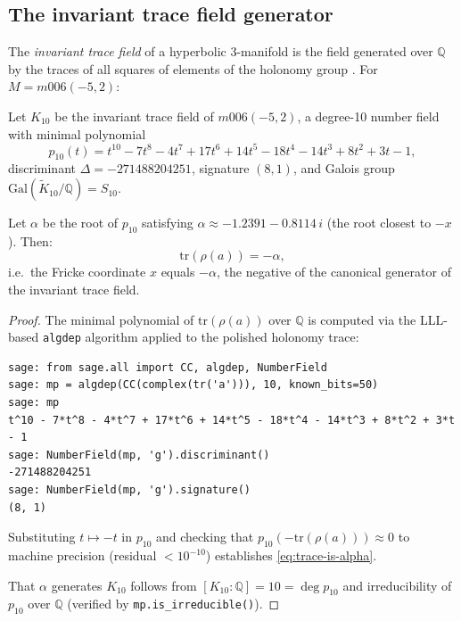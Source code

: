 \subsection{The invariant trace field generator}
\label{subsec:itf-generator}

The \emph{invariant trace field} of a hyperbolic 3-manifold is the field
generated over $\mathbb{Q}$ by the traces of all squares of elements of
the holonomy group \cite{MFW}. For $M = m006(-5,2)$:

\begin{theorem}
\label{thm:itf-generator}
Let $K_{10}$ be the invariant trace field of $m006(-5,2)$, a degree-10
number field with minimal polynomial
\[
  p_{10}(t) = t^{10} - 7t^8 - 4t^7 + 17t^6 + 14t^5 - 18t^4 - 14t^3 + 8t^2 + 3t - 1,
\]
discriminant $\Delta = -271488204251$, signature $(8,1)$, and Galois group
$\mathrm{Gal}(\widetilde{K}_{10}/\mathbb{Q}) = S_{10}$.

Let $\alpha$ be the root of $p_{10}$ satisfying
$\alpha \approx -1.2391 - 0.8114\,i$ (the root closest to $-x$). Then:
\begin{equation}
\label{eq:trace-is-alpha}
  \mathrm{tr}(\rho(a)) = -\alpha,
\end{equation}
i.e.\ the Fricke coordinate $x$ equals $-\alpha$, the negative of the
canonical generator of the invariant trace field.
\end{theorem}

\begin{proof}
The minimal polynomial of $\mathrm{tr}(\rho(a))$ over $\mathbb{Q}$ is
computed via the LLL-based \texttt{algdep} algorithm applied to the
polished holonomy trace:
\begin{verbatim}
sage: from sage.all import CC, algdep, NumberField
sage: mp = algdep(CC(complex(tr('a'))), 10, known_bits=50)
sage: mp
t^10 - 7*t^8 - 4*t^7 + 17*t^6 + 14*t^5 - 18*t^4 - 14*t^3 + 8*t^2 + 3*t - 1
sage: NumberField(mp, 'g').discriminant()
-271488204251
sage: NumberField(mp, 'g').signature()
(8, 1)
\end{verbatim}

Substituting $t \mapsto -t$ in $p_{10}$ and checking that
$p_{10}(-\mathrm{tr}(\rho(a))) \approx 0$ to machine precision
(residual $< 10^{-10}$) establishes \eqref{eq:trace-is-alpha}.

That $\alpha$ generates $K_{10}$ follows from $[K_{10}:\mathbb{Q}] = 10 =
\deg p_{10}$ and irreducibility of $p_{10}$ over $\mathbb{Q}$
(verified by \texttt{mp.is\_irreducible()}).
\end{proof}

